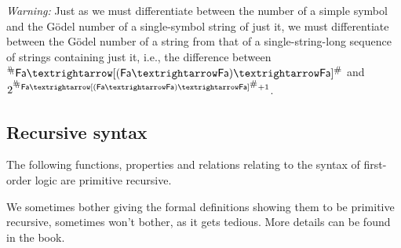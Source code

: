 \documentclass[12pt]{report}
\theoremstyle{nonumberplain}
\newcommand{\Gn}[1]{{^{\reflectbox{\footnotesize\#}}}{#1}{^{\mbox{\footnotesize\#}}}}
\renewcommand{\o}[1]{\mathsf{#1}}
\begin{document}
\noindent \emph{Warning:} Just as we must differentiate between the number of a simple symbol and the Gödel number of a single-symbol string of just it, we must differentiate between the Gödel number of a string from that of a single-string-long sequence of strings containing just it, i.e., the difference between $\Gn{\o{Fa} → [(\o{Fa} → \o{Fa}) → \o{Fa}]}$ and $2^{\Gn{\o{Fa} → [(\o{Fa} → \o{Fa}) → \o{Fa}]}+1}$.

\subsection*{Recursive syntax}

\begin{mt}
The following functions, properties and relations relating to the syntax of first-order logic are primitive recursive.
\end{mt}
We sometimes bother giving the formal definitions showing them to be primitive recursive, sometimes won't bother, as it gets tedious. More details can be found in the book.
\end{document}
